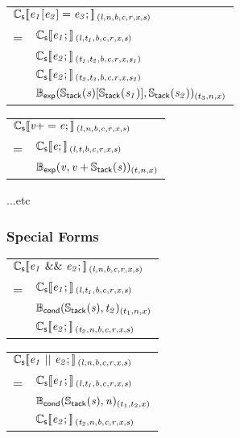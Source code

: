 \documentclass[a4j]{jsarticle}
\newcommand{\lb}{[\![}				%
\newcommand{\rb}{]\!]}				%
\newcommand{\db}[1]{\lb#1\rb}			%
\newcommand{\den}[2]{{#1}\db{#2}\,}
\newcommand{\defC}[3]{\den{#1}{\sf #2}_{\it #3}}
\newcommand{\Cs}{\defC{\mathbb{C}_{\sf s}}}
\newcommand{\Stack}[1]{\mathbb{S}_{\sf tack}(#1)}
\newcommand{\defB}[3]{{#1}({\sf #2})_{#3}}
\newcommand{\Bexp}{\defB{\mathbb{B}_{\sf exp}}}
\newcommand{\Bcond}{\defB{\mathbb{B}_{\sf cond}}}
\newcommand{\var}[1]{{\it #1}}
\begin{document}
\begin{tabular}{ll}
	\multicolumn{2}{l}{
		$ \Cs{ \var{e_1}[\var{e_2}] = \var{e_3}; }{(l, n, b, c, r, x, s)} $
	}  \\
	=   &  $ \Cs{ \var{e_1}; }{(l  , t_1, b, c, r, x, s)}                                $  \\
	    &  $ \Cs{ \var{e_2}; }{(t_1, t_2, b, c, r, x, s_1)}                              $  \\
	    &  $ \Cs{ \var{e_2}; }{(t_2, t_3, b, c, r, x, s_2)}                              $  \\
	    &  $ \Bexp{ \Stack{\var{s}}[\Stack{\var{s_1}}], \Stack{\var{s_2}} }{(t_3, n, x)} $
\end{tabular}

\vspace{1em}

\begin{tabular}{ll}
	\multicolumn{2}{l}{
		$ \Cs{ \var{v} += \var{e}; }{(l, n, b, c, r, x, s)} $
	}  \\
	=   &  $ \Cs{ \var{e}; }{(l, t, b, c, r, x, s)} $  \\
	    &  $ \Bexp{ \var{v}, \var{v}+\Stack{\var{s}} }{(t, n, x)}      $
\end{tabular}

\vspace{1em}

...etc


\subsubsection{Special Forms}

\begin{tabular}{ll}
	\multicolumn{2}{l}{
		$ \Cs{ \var{e_1}\ \&\&\ \var{e_2}; }{(l, n, b, c, r, x, s)} $
	}  \\
	=   &  $ \Cs{ \var{e_1}; }{(l, t_1, b, c, r, x, s)}        $  \\
	    &  $ \Bcond{ \Stack{\var{s}}, \var{t_2} }{(t_1, n, x)} $  \\
	    &  $ \Cs{ \var{e_2}; }{(t_2, n, b, c, r, x, s)}        $
\end{tabular}

\vspace{1em}

\begin{tabular}{ll}
	\multicolumn{2}{l}{
		$ \Cs{ \var{e_1}\ ||\ \var{e_2}; }{(l, n, b, c, r, x, s)} $
	}  \\
	=   &  $ \Cs{ \var{e_1}; }{(l, t_1, b, c, r, x, s)}        $  \\
	    &  $ \Bcond{ \Stack{\var{s}}, \var{n} }{(t_1, t_2, x)} $  \\
	    &  $ \Cs{ \var{e_2}; }{(t_2, n, b, c, r, x, s)}        $
\end{tabular}
\end{document}

